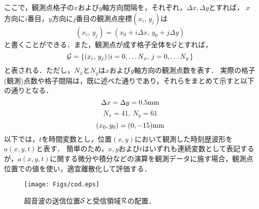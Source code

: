 ここで，観測点格子の$x$および$y$軸方向間隔を，それぞれ，$\Delta x,\Delta y$とすれば，
$x$方向に$i$番目，$y$方向に$j$番目の観測点座標$(x_i,\, y_j)$は
\begin{equation}
	(x_i,\, y_j)=(x_0+i\Delta x,\, y_0+j\Delta y)
	\label{eqn:x_ij}
\end{equation}
と書くことができる．また，観測点が成す格子全体を${\cal G}$とすれば，
\begin{equation}
	{\cal G} = \left\{ 
	(x_i,\, y_j)\left| i=0,\dots N_x, \, j=0,\dots N_y  \right.
	\right\}
	\label{eqn:Grid}
\end{equation}
と表される．ただし，$N_x$と$N_y$は$x$および$y$軸方向の観測点数を表す．
実際の格子(観測)点数や格子間隔は，既に述べた通りであり，それらをまとめて示すと以下の通りとなる．
\begin{equation}
	\Delta x=\Delta y=0.5 {\rm mm}
	\label{eqn:grid_prms}
\end{equation}
\begin{equation}
	N_x=41, \, N_y=61
	\label{eqn:grid_nums}
\end{equation}
\begin{equation}
	(x_0,y_0)=(0,-15){\rm mm}
	\label{eqn:grid_corner}
\end{equation}
以下では，$t$を時間変数とし，位置$(x,y)$において観測した時刻歴波形を$a(x,y,t)$と表す．
簡単のため，$x,y$および$t$はいずれも連続変数として表記するが，$a(x,y,t)$に関する微分や積分などの演算を観測データに施す場合，観測点位置での値を使い，適宜離散化して評価する．
\begin{figure}[t]
\begin{center}
\texttt{[image: Figs/cod.eps]}
\caption{
	超音波の送信位置$\cal S$と受信領域$\cal R$の配置．
}
\label{fig:fig4}
\end{center}
\end{figure}
